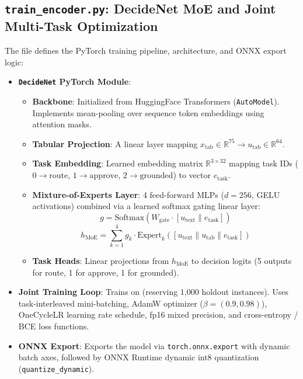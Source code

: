 \documentclass[11pt,a4paper]{article}
\begin{document}
\subsection{\texttt{train\_encoder.py}: DecideNet MoE and Joint Multi-Task Optimization}
The file  defines the PyTorch training pipeline, architecture, and ONNX export logic:
\begin{itemize}
  \item \textbf{\texttt{DecideNet} PyTorch Module}:
    \begin{itemize}
      \item \textbf{Backbone}: Initialized from HuggingFace Transformers (\texttt{AutoModel}). Implements mean-pooling over sequence token embeddings using attention masks.
      \item \textbf{Tabular Projection}: A linear layer mapping $x_{\text{tab}} \in \mathbb{R}^{75} \to u_{\text{tab}} \in \mathbb{R}^{64}$.
      \item \textbf{Task Embedding}: Learned embedding matrix $\mathbb{R}^{3 \times 32}$ mapping task IDs ($0 \to \text{route}$, $1 \to \text{approve}$, $2 \to \text{grounded}$) to vector $e_{\text{task}}$.
      \item \textbf{Mixture-of-Experts Layer}: 4 feed-forward MLPs ($d=256$, GELU activations) combined via a learned softmax gating linear layer:
      $$g = \text{Softmax}(W_{\text{gate}} \cdot [u_{\text{text}} \parallel e_{\text{task}}])$$
      $$h_{\text{MoE}} = \sum_{k=1}^4 g_k \cdot \text{Expert}_k([u_{\text{text}} \parallel u_{\text{tab}} \parallel e_{\text{task}}])$$
      \item \textbf{Task Heads}: Linear projections from $h_{\text{MoE}}$ to decision logits (5 outputs for route, 1 for approve, 1 for grounded).
    \end{itemize}
  \item \textbf{Joint Training Loop}: Trains on  (reserving 1,000 holdout instances). Uses task-interleaved mini-batching, AdamW optimizer ($\beta = (0.9, 0.98)$), OneCycleLR learning rate schedule, fp16 mixed precision, and cross-entropy / BCE loss functions.
  \item \textbf{ONNX Export}: Exports the model via \texttt{torch.onnx.export} with dynamic batch axes, followed by ONNX Runtime dynamic int8 quantization (\texttt{quantize\_dynamic}).
\end{itemize}
\end{document}
